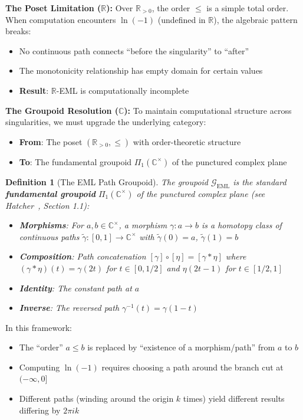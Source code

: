 \documentclass[11pt]{article}
\newtheorem{definition}[theorem]{Definition}
\providecommand{\tightlist}{%
  \setlength{\itemsep}{0pt}\setlength{\parskip}{0pt}}
\begin{document}
\textbf{The Poset Limitation (\(\mathbb{R}\)):} Over \(\mathbb{R}_{>0}\), the order \(\leq\) is a simple total order. When computation encounters \(\ln(-1)\) (undefined in \(\mathbb{R}\)), the algebraic pattern breaks:
\begin{itemize}
\tightlist
\item
  No continuous path connects ``before the singularity'' to ``after''
\item
  The monotonicity relationship has empty domain for certain values
\item
  \textbf{Result}: \(\mathbb{R}\)-EML is computationally incomplete
\end{itemize}

\textbf{The Groupoid Resolution (\(\mathbb{C}\)):} To maintain computational structure across singularities, we must upgrade the underlying category:
\begin{itemize}
\tightlist
\item
  \textbf{From}: The poset \((\mathbb{R}_{>0}, \leq)\) with order-theoretic structure
\item
  \textbf{To}: The fundamental groupoid $\Pi_1(\mathbb{C}^\times)$ of the punctured complex plane~\cite{Hatcher02}
\end{itemize}

\begin{definition}[The EML Path Groupoid]\label{def:path-groupoid}
The groupoid $\mathcal{G}_{\text{EML}}$ is the standard \textbf{fundamental groupoid} $\Pi_1(\mathbb{C}^\times)$ of the punctured complex plane (see Hatcher~\cite{Hatcher02}, Section 1.1):
\begin{itemize}
\item \textbf{Morphisms}: For \(a, b \in \mathbb{C}^\times\), a morphism \(\gamma: a \to b\) is a homotopy class of continuous paths \(\tilde{\gamma}: [0,1] \to \mathbb{C}^\times\) with \(\tilde{\gamma}(0) = a\), \(\tilde{\gamma}(1) = b\)
\item \textbf{Composition}: Path concatenation \([\gamma] \circ [\eta] = [\gamma * \eta]\) where \((\gamma * \eta)(t) = \gamma(2t)\) for \(t \in [0,1/2]\) and \(\eta(2t-1)\) for \(t \in [1/2,1]\)
\item \textbf{Identity}: The constant path at \(a\)
\item \textbf{Inverse}: The reversed path \(\gamma^{-1}(t) = \gamma(1-t)\)
\end{itemize}
\end{definition}

In this framework:
\begin{itemize}
\tightlist
\item
  The ``order'' \(a \leq b\) is replaced by ``existence of a morphism/path'' from \(a\) to \(b\)
\item
  Computing \(\ln(-1)\) requires choosing a path around the branch cut at \((-\infty, 0]\)
\item
  Different paths (winding around the origin \(k\) times) yield different results differing by \(2\pi i k\)
\end{itemize}
\end{document}
